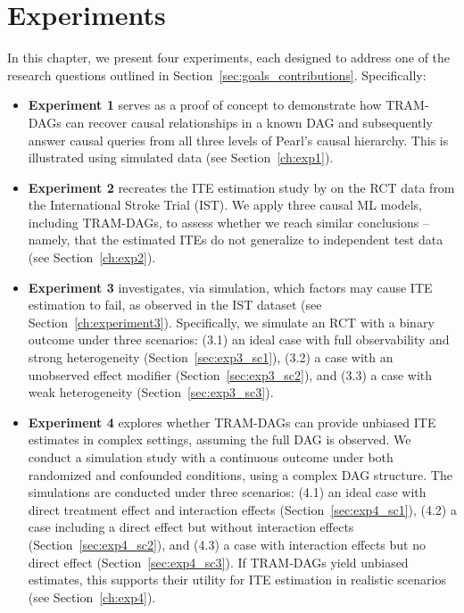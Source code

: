 

\chapter{Experiments} \label{ch:experiments}

In this chapter, we present four experiments, each designed to address one of the research questions outlined in Section~\ref{sec:goals_contributions}. Specifically:

\begin{itemize}

    \item \textbf{Experiment 1} serves as a proof of concept to demonstrate how TRAM-DAGs can recover causal relationships in a known DAG and subsequently answer causal queries from all three levels of Pearl's causal hierarchy. This is illustrated using simulated data (see Section~\ref{ch:exp1}).

    \item \textbf{Experiment 2} recreates the ITE estimation study by \citet{chen2025} on the RCT data from the International Stroke Trial (IST). We apply three causal ML models, including TRAM-DAGs, to assess whether we reach similar conclusions -- namely, that the estimated ITEs do not generalize to independent test data (see Section~\ref{ch:exp2}).


     \item \textbf{Experiment 3} investigates, via simulation, which factors may cause ITE estimation to fail, as observed in the IST dataset (see Section~\ref{ch:experiment3}). Specifically, we simulate an RCT with a binary outcome under three scenarios: (3.1) an ideal case with full observability and strong heterogeneity (Section~\ref{sec:exp3_sc1}), (3.2) a case with an unobserved effect modifier (Section~\ref{sec:exp3_sc2}), and (3.3) a case with weak heterogeneity (Section~\ref{sec:exp3_sc3}).
     
    \item \textbf{Experiment 4} explores whether TRAM-DAGs can provide unbiased ITE estimates in complex settings, assuming the full DAG is observed. We conduct a simulation study with a continuous outcome under both randomized and confounded conditions, using a complex DAG structure. The simulations are conducted under three scenarios: (4.1) an ideal case with direct treatment effect and interaction effects (Section~\ref{sec:exp4_sc1}), (4.2) a case including a direct effect but without interaction effects (Section~\ref{sec:exp4_sc2}), and (4.3) a case with interaction effects but no direct effect (Section~\ref{sec:exp4_sc3}). If TRAM-DAGs yield unbiased estimates, this supports their utility for ITE estimation in realistic scenarios (see Section~\ref{ch:exp4}).

\end{itemize}

